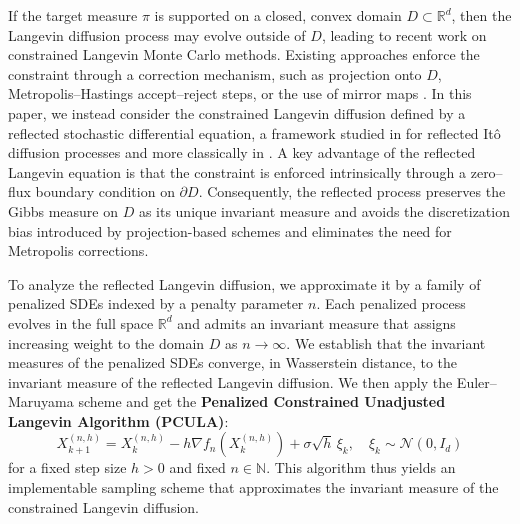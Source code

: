 \documentclass[amsfonts, reqno]{amsart}
\theoremstyle{definition}
\theoremstyle{remark}
\newcommand{\bbR}{\mathbb{R}}
\newcommand{\bbN}{\mathbb{N}}
\numberwithin{equation}{section}
\begin{document}
If the target measure $\pi$ is supported on a closed, convex domain $D \subset \bbR^d$, then the Langevin diffusion process may evolve outside of $D$, leading to recent work on constrained Langevin Monte Carlo methods. Existing approaches enforce the constraint through a correction mechanism, such as projection onto $D$, Metropolis--Hastings accept--reject steps, or the use of mirror maps \cites{Bubeck2015, Lamperski2021-2, Hsieh2020}.  
In this paper, we instead consider the constrained Langevin diffusion defined by a reflected stochastic differential equation, a framework studied in \cites{slominski2013, Slominski2001} for reflected It\^{o} diffusion processes and more classically in \cite{Tanaka1979}. A key advantage of the reflected Langevin equation is that the constraint is enforced intrinsically through a zero--flux boundary condition on $\partial D$.  Consequently, the reflected process preserves the Gibbs measure on $D$ as its unique invariant measure and avoids the discretization bias introduced by projection-based schemes and eliminates the need for Metropolis corrections.


To analyze the reflected Langevin diffusion, we approximate it by a family of 
penalized SDEs indexed by a penalty parameter $n$.  
Each penalized process evolves in the full space $\mathbb{R}^d$ and admits an invariant measure that assigns increasing weight to the domain $D$ 
as $n\to\infty$. We establish that the invariant measures of the penalized SDEs converge, in Wasserstein distance, to the invariant measure of the reflected Langevin diffusion. We then apply the Euler--Maruyama scheme and get the \textbf{Penalized Constrained Unadjusted Langevin Algorithm (PCULA)}:
\begin{equation*} \label{pcula}
X_{k+1}^{(n,h)} = X_k^{(n,h)} - h \nabla f_n\left(X_k^{(n,h)}\right) + \sigma\sqrt{h}\,\xi_k, \quad \xi_k \sim \mathcal{N}(0, I_d)
\end{equation*} for a fixed step size $h > 0$ and fixed $n \in \bbN.$
This algorithm thus yields an implementable sampling scheme that approximates 
the invariant measure of the constrained Langevin diffusion.
\end{document}
